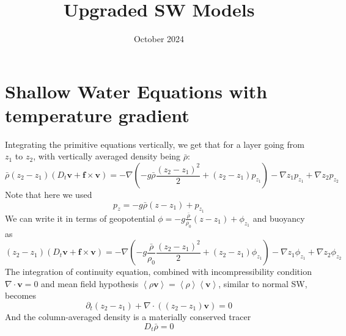 \documentclass{article}
\title{Upgraded SW Models}
\date{October 2024}
\begin{document}
\maketitle

\section{Shallow Water Equations with temperature gradient}
Integrating the primitive equations vertically, we get that for a layer going from $z_1$ to $z_2$, with vertically averaged density being $\bar{\rho}$:
\begin{equation}
    \bar{\rho}\left(z_2-z_1\right)\left(D_t\mathbf{v}+\mathbf{f}\times\mathbf{v}\right)=-\nabla\left(-g\bar{\rho}\frac{(z_2-z_1)^2}{2}+\left(z_2-z_1\right)p_{z_1}\right)-\nabla z_1 p_{z_1}+\nabla z_2 p_{z_2}
\end{equation}
Note that here we used
\begin{equation}
    p_z=-g\bar{\rho}\left(z-z_1\right)+p_{z_1}
\end{equation}
We can write it in terms of geopotential $\phi=-g\frac{\bar{\rho}}{\rho_0}(z-z_1)+\phi_{z_1}$ and buoyancy as
\begin{equation}
    \left(z_2-z_1\right)\left(D_t\mathbf{v}+\mathbf{f}\times\mathbf{v}\right)=-\nabla\left(-g\frac{\bar{\rho}}{\rho_0}\frac{(z_2-z_1)^2}{2}+\left(z_2-z_1\right)\phi_{z_1}\right)-\nabla z_1 \phi_{z_1}+\nabla z_2 \phi_{z_2}
\end{equation}
The integration of continuity equation, combined with incompressibility condition $\nabla \cdot \mathbf{v}=0$ and mean field hypothesis $\left<\rho \mathbf{v}\right>=\left<\rho \right>\left<\mathbf{v}\right>$, similar to normal SW, becomes
\begin{equation}
    \partial_t\left(z_2-z_1\right)+\nabla\cdot\left((z_2-z_1)\mathbf{v}\right)=0
\end{equation}
And the column-averaged density is a materially conserved tracer
\begin{equation}
    D_t \bar{\rho} = 0
\end{equation}
\end{document}
